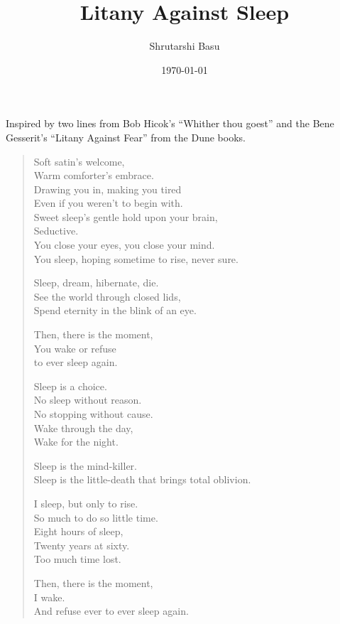 \documentclass[11pt,letterpaper]{article}
\title{Litany Against Sleep}
\author{Shrutarshi Basu}
\date{\today}
\begin{document}
\maketitle

\begin{center}
\begin{boxedminipage}{0.55\textwidth}
Inspired by two lines from Bob Hicok's ``Whither thou goest'' and the Bene Gesserit's ``Litany Against Fear'' from the Dune books.
\end{boxedminipage}
\end{center}

\begin{verse}

Soft satin's welcome,\\
Warm comforter's embrace.\\
Drawing you in, making you tired\\
Even if you weren't to begin with.\\
Sweet sleep's gentle hold upon your brain,\\
Seductive.\\
You close your eyes, you close your mind.\\
You sleep, hoping sometime to rise, never sure.

Sleep, dream, hibernate, die.\\
See the world through closed lids,\\
Spend eternity in the blink of an eye.

Then, there is the moment,\\
You wake or refuse\\
to ever sleep again.

Sleep is a choice.\\
No sleep without reason.\\
No stopping without cause.\\
Wake through the day, \\
Wake for the night.

Sleep is the mind-killer.\\
Sleep is the little-death that brings total oblivion.

I sleep, but only to rise.\\
So much to do so little time.\\
Eight hours of sleep,\\
Twenty years at sixty.\\
Too much time lost.

Then, there is the moment, \\
I wake.\\
And refuse ever to ever sleep again.
\end{verse}
\end{document}
